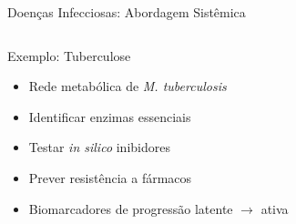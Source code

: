 \begin{frame}{Doenças Infecciosas: Abordagem Sistêmica}
\begin{columns}
\begin{exampleblock}{Exemplo: Tuberculose}
\begin{itemize}
    \item Rede metabólica de \textit{M. tuberculosis}
    \item Identificar enzimas essenciais
    \item Testar \textit{in silico} inibidores
    \item Prever resistência a fármacos
    \item Biomarcadores de progressão latente $\rightarrow$ ativa
\end{itemize}
\end{exampleblock}
\end{columns}
\end{frame}

